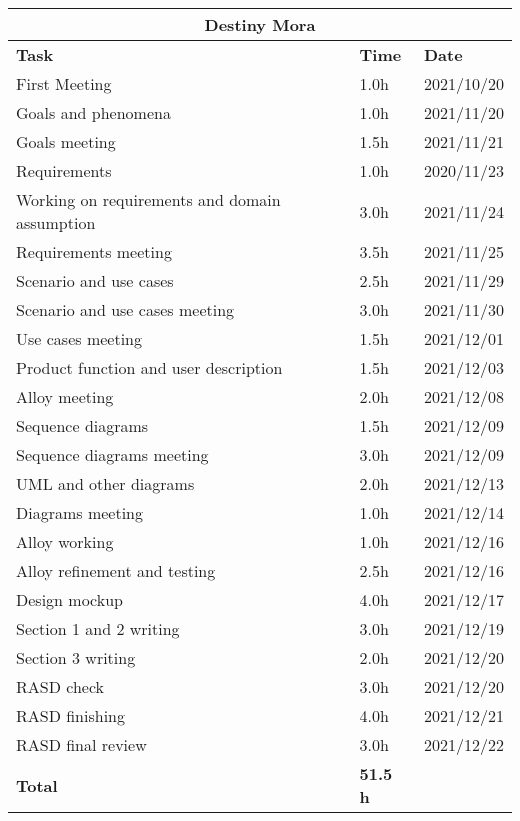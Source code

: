 \begin{table}[!ht]
\centering
\begin{tabular}{|p{}|p{}|p{}|}
\hline
\multicolumn{3}{|c|}{\textbf{Destiny Mora}}            \\ \hline
\textbf{Task}                   & \textbf{Time} & \textbf{Date} \\ \hline

First Meeting				&		1.0h	   &	2021/10/20 \\ \hline
Goals and phenomena			&		1.0h	   & 	2021/11/20 \\ \hline
Goals meeting					&		1.5h	   &	2021/11/21 \\ \hline
Requirements		&		1.0h	   &	2020/11/23 \\ \hline
Working on requirements and domain assumption			&		3.0h	   &	2021/11/24 \\ \hline
Requirements  meeting		&		3.5h	   &	2021/11/25 \\ \hline
Scenario and use cases		&		2.5h    &   	2021/11/29 \\ \hline
Scenario and use cases meeting     	&		3.0h	   & 	2021/11/30 \\ \hline
Use cases meeting		&		1.5h	   & 	2021/12/01 \\ \hline
Product function and user description		&		1.5h	   & 	2021/12/03 \\ \hline
Alloy meeting				&		2.0h     &	2021/12/08 \\ \hline
Sequence diagrams			&		1.5h	  &	2021/12/09 \\ \hline
Sequence diagrams meeting				&		3.0h	   & 	2021/12/09 \\ \hline
UML and other diagrams				&		2.0h	   & 	2021/12/13 \\ \hline
Diagrams meeting				&		1.0h	   & 	2021/12/14 \\ \hline
Alloy working		&		1.0h	  &    2021/12/16 \\ \hline
Alloy refinement and testing		&		2.5h	  &    2021/12/16 \\ \hline
Design mockup			&		4.0h	  &    2021/12/17 \\ \hline 
Section 1 and 2 writing 			&		3.0h	  &    2021/12/19 \\ \hline 
Section 3 writing 			&		2.0h	  &    2021/12/20 \\ \hline 
RASD check				&		3.0h   &	2021/12/20 \\ \hline
RASD finishing				&		4.0h	  &    2021/12/21  \\ \hline
RASD final review			&		3.0h	  &    2021/12/22  \\ \hline
\textbf{Total}                  		&  \textbf{51.5 h}   & \\ \hline
\end{tabular}
\end{table}

